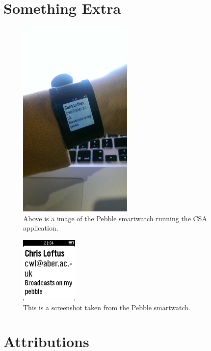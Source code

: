 \documentclass{article}
\begin{document}
\section{Something Extra}
\begin{figure}[H]
\centering
\includegraphics[width=0.5\textwidth]{pebble}
\caption{Above is a image of the Pebble smartwatch running the CSA application.}
\end{figure}

\begin{figure}[H]
\centering
\includegraphics[width=0.25\textwidth]{pebblesh}
\caption{This is a screenshot taken from the Pebble smartwatch.}
\end{figure}

\newpage
\section*{Attributions}

\newpage
\printbibliography
\end{document}

